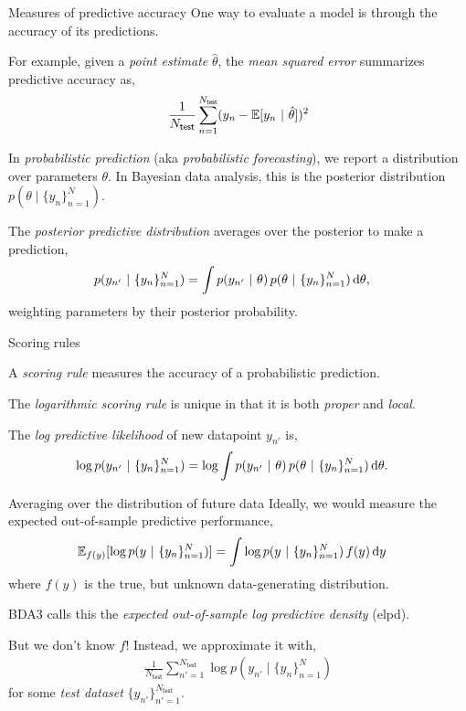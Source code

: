 \documentclass[aspectratio=169]{beamer}
\begin{document}
\begin{frame}{Measures of predictive accuracy}
    One way to evaluate a model is through the accuracy of its predictions.
    
    For example, given a \textit{point estimate} $\hat{\theta}$, the \textit{mean squared error} summarizes predictive accuracy as,
    \begin{align}
        \frac{1}{N_{\mathsf{test}}} \sum_{n=1}^{N_{\mathsf{test}}} (y_n - \mathbb{E}[y_n ~\vert~ \hat{\theta}])^2
    \end{align}
    
    In \textit{probabilistic prediction} (aka \textit{probabilistic forecasting}), we report a distribution over parameters $\theta$. In Bayesian data analysis, this is the posterior distribution $p(\theta \mid \{y_n\}_{n=1}^N)$. 
    
    The \emph{posterior predictive distribution} averages over the posterior to make a prediction,
    \begin{align}
        p(y_{n'} ~\vert~ \{y_n\}_{n=1}^N) &= \int p(y_{n'} ~\vert~ \theta) \, p(\theta ~\vert~ \{y_n\}_{n=1}^N) \mathop{}\!\mathrm{d} \theta,
    \end{align}
    weighting parameters by their posterior probability.

\end{frame}

\begin{frame}{Scoring rules}

    A \emph{scoring rule} measures the accuracy of a probabilistic prediction. 
    
    The \emph{logarithmic scoring rule} is unique in that it is both \textit{proper} and \textit{local}. 
    
    The \textit{log predictive likelihood} of new datapoint $y_{n'}$ is,
    \begin{align}
        \log p(y_{n'} ~\vert~ \{y_n\}_{n=1}^N) &= \log \int p(y_{n'} ~\vert~ \theta) \, p(\theta ~\vert~ \{y_n\}_{n=1}^N) \mathop{}\!\mathrm{d} \theta.
    \end{align}
    
\end{frame}

\begin{frame}{Averaging over the distribution of future data}
    Ideally, we would measure the expected out-of-sample predictive performance,
    \begin{align}
        \mathbb{E}_{f(y)}[\log p(y ~\vert~ \{y_n\}_{n=1}^N)] &= \int \log p(y ~\vert~ \{y_n\}_{n=1}^N) \, f(y) \mathop{}\!\mathrm{d} y
    \end{align}
    where $f(y)$ is the true, but unknown data-generating distribution.
    
    BDA3 calls this the \emph{expected out-of-sample log predictive density} (elpd). 
    
    But we don't know $f$! Instead, we approximate it with,
    \begin{align}
        \frac{1}{N_{\mathsf{test}}} \sum_{n'=1}^{N_{\mathsf{test}}} \log p(y_{n'} \mid \{y_n\}_{n=1}^N)
    \end{align}
    for some \emph{test dataset} $\{y_{n'}\}_{n'=1}^{N_{\mathsf{test}}}$.
\end{frame}
\end{document}
